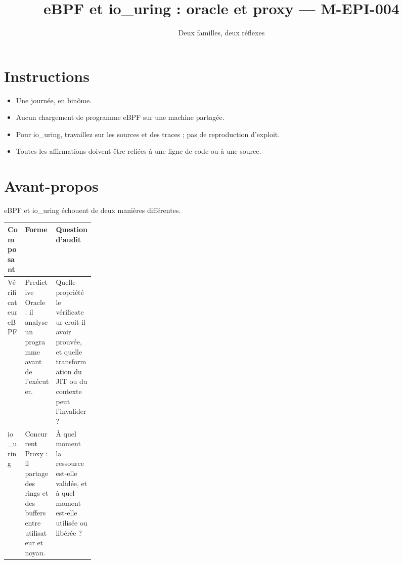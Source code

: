 \documentclass{training}
\begin{document}
\title{eBPF et io\_uring : oracle et proxy --- M-EPI-004}
\subtitle{Deux familles, deux réflexes}
\maketitle

\newpage
\tableofcontents
\newpage

\chapter{Instructions}
\begin{itemize}
  \item Une journée, en binôme.
  \item Aucun chargement de programme eBPF sur une machine partagée.
  \item Pour io\_uring, travaillez sur les sources et des traces ; pas de
        reproduction d'exploit.
  \item Toutes les affirmations doivent être reliées à une ligne de code ou
        à une source.
\end{itemize}





\chapter{Avant-propos}

eBPF et io\_uring échouent de deux manières différentes.

\begin{center}
\begin{tabularx}{\linewidth}{|p{0.2\linewidth}|X|X|}
\hline
\textbf{Composant} & \textbf{Forme} & \textbf{Question d'audit} \\ \hline
Vérificateur eBPF & Predictive Oracle : il analyse un programme avant de
l'exécuter. & Quelle propriété le vérificateur croit-il avoir prouvée, et
quelle transformation du JIT ou du contexte peut l'invalider ? \\ \hline
io\_uring & Concurrent Proxy : il partage des rings et des buffers entre
utilisateur et noyau. & À quel moment la ressource est-elle validée, et à
quel moment est-elle utilisée ou libérée ? \\ \hline
\end{tabularx}
\end{center}
\end{document}
